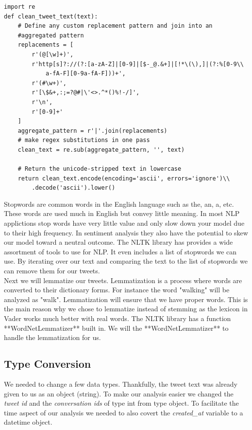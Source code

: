\documentclass[12pt]{article}
\begin{document}
            \begin{lstlisting}[caption=Regular Expression Cleaner]
import re
def clean_tweet_text(text):
    # Define any custom replacement pattern and join into an 
    #aggregated pattern
    replacements = [
        r'(@[\w]+)',
        r'http[s]?://(?:[a-zA-Z]|[0-9]|[$-_@.&+]|[!*\(\),]|(?:%[0-9\\ 
            a-fA-F][0-9a-fA-F]))+',
        r'(#\w+)',
        r'[\$&+,:;=?@#|\'<>.^*()%!-/]',
        r'\n',
        r'[0-9]+'
    ]
    aggregate_pattern = r'|'.join(replacements)
    # make regex substitutions in one pass
    clean_text = re.sub(aggregate_pattern, '', text) 
    
    # Return the unicode-stripped text in lowercase
    return clean_text.encode(encoding='ascii', errors='ignore')\\
        .decode('ascii').lower()
            \end{lstlisting}

            Stopwords are common words in the English language such as the, an, a, etc. These words are used much in English but convey little meaning. In most NLP applictions stop 
            words have very little value and only slow down your model due to their high frequency. In sentiment analysis they also have the potential to skew our model toward a neutral
            outcome. The NLTK library has provides a wide assortment of tools to use for NLP. It even includes a list of stopwords we can use. By iterating over our text and comparing
            the text to the list of stopwords we can remove them for our tweets. \\

            Next we will lemmatize our tweets. Lemmatization is a process where words are converted to their dictionary forms. For instance the word "walking" will be analyzed as "walk". 
            Lemmatization will ensure that we have proper words. This is the main reason why we chose to lemmatize instead of stemming as the lexicon in Vader works much better with real 
            words. The NLTK library has a function **WordNetLemmatizer** built in. We will the **WordNetLemmatizer** to handle the lemmatization for us. \\

        \subsection{Type Conversion}
            We needed to change a few data types. Thankfully, the tweet text was already given to us as an object (string). To make our analysis easier we changed the \textit{tweet id} and the 
            \textit{conversation ids} of type int from type object. To facilitate the time aspect of our analysis we needed to also covert the \textit{created\_at} variable to a datetime object.\\
\end{document}
